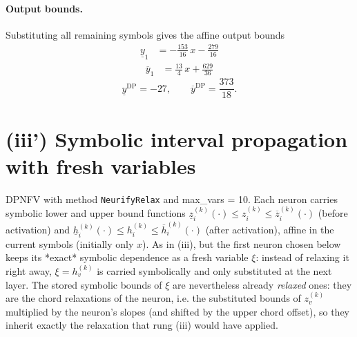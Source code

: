 \documentclass[11pt]{article}
\begin{document}
\paragraph{Output bounds.}
Substituting all remaining symbols gives the affine output bounds
\begin{align*}
\underline{y}_{1} &= -\frac{153}{16}\,x - \frac{279}{16}
\end{align*}
\begin{align*}
\overline{y}_{1} &= \frac{13}{4}\,x + \frac{629}{36}
\end{align*}
\begin{equation*}
\underline{y}^{\text{DP}} = -27, \qquad \overline{y}^{\text{DP}} = \frac{373}{18}.
\end{equation*}

\section{(iii') Symbolic interval propagation with fresh variables}
DPNFV with method \texttt{NeurifyRelax} and max\_vars = 10. Each neuron carries symbolic lower and upper bound functions
$\underline{z}^{(k)}_i(\cdot) \le z^{(k)}_i \le \overline{z}^{(k)}_i(\cdot)$ (before activation)
and $\underline{h}^{(k)}_i(\cdot) \le h^{(k)}_i \le \overline{h}^{(k)}_i(\cdot)$ (after activation),
affine in the current symbols (initially only $x$).
As in (iii), but the first neuron chosen below keeps its *exact*
symbolic dependence as a fresh variable $\xi$: instead of relaxing it right away, $\xi = h^{(k)}_v$
is carried symbolically and only substituted at the next layer. The stored symbolic bounds of $\xi$
are nevertheless already \emph{relaxed} ones: they are the chord relaxations of the neuron, i.e.
the substituted bounds of $z^{(k)}_v$ multiplied by the neuron's slopes (and shifted by the upper
chord offset), so they inherit exactly the relaxation that rung (iii) would have applied.
\end{document}
